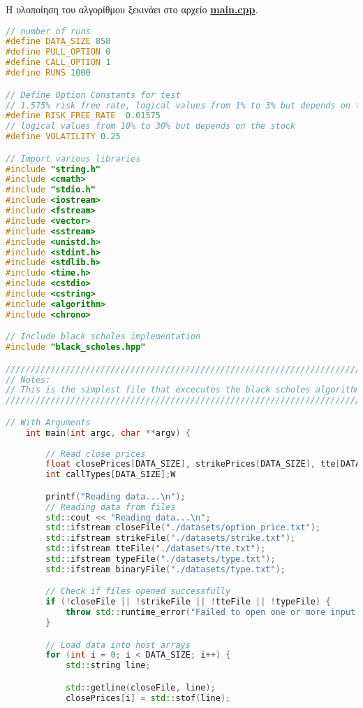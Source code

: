 Η υλοποίηση του αλγορίθμου ξεκινάει στο αρχείο \href{https://github.com/VasilisMpletsos/Black-Scholes/tree/main}{\textbf{main.cpp}}.

\begin{lstlisting}[language=C++, caption={main.cpp}]
// number of runs
#define DATA_SIZE 858
#define PULL_OPTION 0
#define CALL_OPTION 1
#define RUNS 1000

// Define Option Constants for test
// 1.575% risk free rate, logical values from 1% to 3% but depends on the country
#define RISK_FREE_RATE  0.01575
// logical values from 10% to 30% but depends on the stock
#define VOLATILITY 0.25

// Import various libraries
#include "string.h"
#include <cmath>
#include "stdio.h"
#include <iostream>
#include <fstream>
#include <vector>
#include <sstream>
#include <unistd.h>
#include <stdint.h>
#include <stdlib.h>
#include <time.h>
#include <cstdio>
#include <cstring>
#include <algorithm>
#include <chrono>

// Include black scholes implementation
#include "black_scholes.hpp"

///////////////////////////////////////////////////////////////////////////////
// Notes:
// This is the simplest file that excecutes the black scholes algorithm on the CPU
///////////////////////////////////////////////////////////////////////////////

// With Arguments
    int main(int argc, char **argv) {
        
        // Read close prices
        float closePrices[DATA_SIZE], strikePrices[DATA_SIZE], tte[DATA_SIZE];
        int callTypes[DATA_SIZE];W

        printf("Reading data...\n");
        // Reading data from files
        std::cout << "Reading data...\n";
        std::ifstream closeFile("./datasets/option_price.txt");
        std::ifstream strikeFile("./datasets/strike.txt");
        std::ifstream tteFile("./datasets/tte.txt");
        std::ifstream typeFile("./datasets/type.txt");
        std::ifstream binaryFile("./datasets/type.txt");

        // Check if files opened successfully
        if (!closeFile || !strikeFile || !tteFile || !typeFile) {
            throw std::runtime_error("Failed to open one or more input files.");
        }

        // Load data into host arrays
        for (int i = 0; i < DATA_SIZE; i++) {
            std::string line;

            std::getline(closeFile, line);
            closePrices[i] = std::stof(line);


\end{lstlisting}
